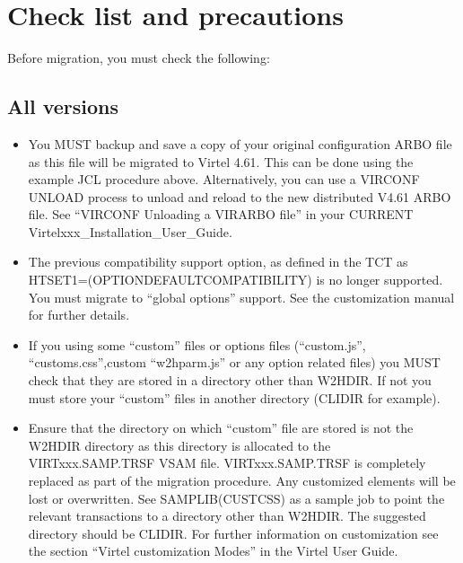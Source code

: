 \documentclass[letterpaper,10pt,english]{sphinxmanual}
\begin{document}
\ignorespaces 

\chapter{Check list and precautions}
\label{\detokenize{Migration_Guide:check-list-and-precautions}}\label{\detokenize{Migration_Guide:index-2}}
\sphinxAtStartPar
Before migration, you must check the following:\sphinxhyphen{}


\section{All versions}
\label{\detokenize{Migration_Guide:all-versions}}\begin{itemize}
\item {} 
\sphinxAtStartPar
You MUST backup and save a copy of your original configuration ARBO file as this file will be migrated to Virtel 4.61. This can be done using the example JCL procedure above. Alternatively, you can use a VIRCONF UNLOAD process to unload and reload to the new distributed V4.61 ARBO file. See “VIRCONF \sphinxhyphen{} Unloading a VIRARBO file” in your CURRENT Virtelxxx\_Installation\_User\_Guide.

\item {} 
\sphinxAtStartPar
The previous compatibility support option, as defined in the TCT as HTSET1=(OPTION\sphinxhyphen{}DEFAULT\sphinxhyphen{}COMPATIBILITY) is no longer supported. You must migrate to “global options” support. See the customization manual for further details.

\item {} 
\sphinxAtStartPar
If you using some “custom” files or options files (“custom.js”, “customs.css”,custom “w2hparm.js” or any option related files) you MUST check that they are stored in a directory other than W2H\sphinxhyphen{}DIR. If not you must store your “custom” files in another directory (CLI\sphinxhyphen{}DIR for example).

\item {} 
\sphinxAtStartPar
Ensure that the directory on which “custom” file are stored is not the W2H\sphinxhyphen{}DIR directory as this directory is allocated to the VIRTxxx.SAMP.TRSF VSAM file. VIRTxxx.SAMP.TRSF is completely replaced as part of the migration procedure. Any customized elements will be lost or overwritten. See SAMPLIB(CUSTCSS) as a sample job to point the relevant transactions to a directory other than W2H\sphinxhyphen{}DIR. The suggested directory should be CLI\sphinxhyphen{}DIR. For further information on customization see the section “Virtel customization Modes” in the Virtel User Guide.

\end{itemize}
\end{document}
